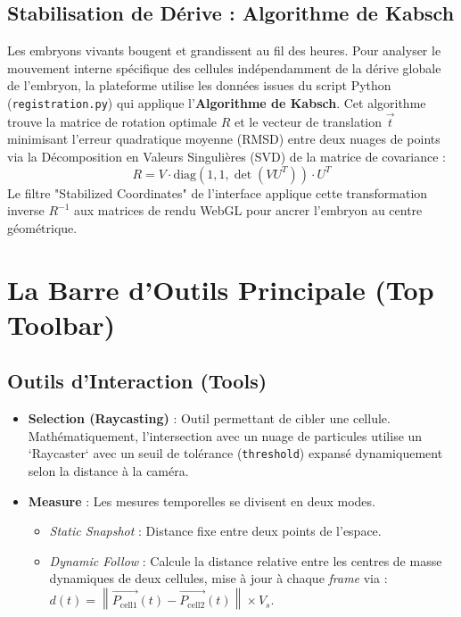 \subsection{Stabilisation de Dérive : Algorithme de Kabsch}
Les embryons vivants bougent et grandissent au fil des heures. Pour analyser le mouvement interne spécifique des cellules indépendamment de la dérive globale de l'embryon, la plateforme utilise les données issues du script Python (\texttt{registration.py}) qui applique l'\textbf{Algorithme de Kabsch}.
Cet algorithme trouve la matrice de rotation optimale $R$ et le vecteur de translation $\vec{t}$ minimisant l'erreur quadratique moyenne (RMSD) entre deux nuages de points via la Décomposition en Valeurs Singulières (SVD) de la matrice de covariance :
\begin{equation}
R = V \cdot \text{diag}(1, 1, \det(V U^T)) \cdot U^T
\end{equation}
Le filtre "Stabilized Coordinates" de l'interface applique cette transformation inverse $R^{-1}$ aux matrices de rendu WebGL pour ancrer l'embryon au centre géométrique.

\section{La Barre d'Outils Principale (Top Toolbar)}

\subsection{Outils d'Interaction (Tools)}
\begin{itemize}
    \item \textbf{Selection (Raycasting)} : Outil permettant de cibler une cellule. Mathématiquement, l'intersection avec un nuage de particules utilise un `Raycaster` avec un seuil de tolérance (\texttt{threshold}) expansé dynamiquement selon la distance à la caméra.
    \item \textbf{Measure} : Les mesures temporelles se divisent en deux modes. 
    \begin{itemize}
        \item \textit{Static Snapshot} : Distance fixe entre deux points de l'espace.
        \item \textit{Dynamic Follow} : Calcule la distance relative entre les centres de masse dynamiques de deux cellules, mise à jour à chaque \textit{frame} via : $d(t) = \left\| \vec{P_{\text{cell1}}}(t) - \vec{P_{\text{cell2}}}(t) \right\| \times V_s$.
    \end{itemize}
\end{itemize}

